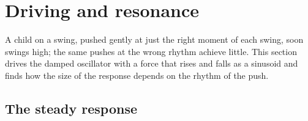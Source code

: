 \section{Driving and resonance}
\label{sec:os-driven}

A child on a swing, pushed gently at just the right moment of each swing,
soon swings high; the same pushes at the wrong rhythm achieve little. This
section drives the damped oscillator with a force that rises and falls as
a sinusoid and finds how the size of the response depends on the rhythm of
the push.

\subsection*{The steady response}

